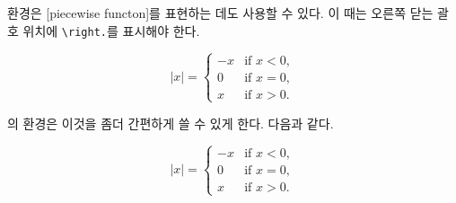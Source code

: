  환경은 [piecewise functon]를 표현하는 데도 사용할 수 있다. 이 때는 오른쪽 닫는 괄호 위치에 \verb|\right.|를
표시해야 한다.
\begin{example}
\begin{equation*}
  |x| = \left\{
    \begin{array}{rl}
      -x & \text{if } x < 0,\\
      0 & \text{if } x = 0,\\
      x & \text{if } x > 0.
    \end{array} \right.
\end{equation*}
\end{example}
의  환경은 이것을 좀더 간편하게 쓸 수 있게 한다.
다음과 같다.
\begin{example}
  \begin{equation*}
    |x| = 
    \begin{cases}
      -x & \text{if } x < 0,\\
      0 & \text{if } x = 0,\\
      x & \text{if } x > 0.
    \end{cases} 
\end{equation*}
\end{example}


